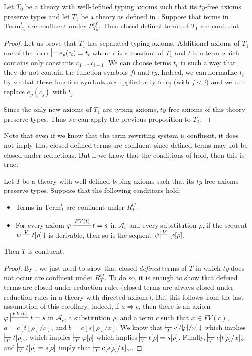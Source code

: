 \documentclass[reqno]{amsart}
\theoremstyle{definition}
\theoremstyle{remark}
\newcommand{\Term}{\mathrm{Term}}
\newcommand{\ft}{\mathit{ft}}
\newcommand{\ty}{\mathit{ty}}
\numberwithin{figure}{section}
\begin{document}
\begin{cor}
Let $T_0$ be a theory with well-defined typing axioms such that its $\ty$-free axioms preserve types and let $T_1$ be a theory as defined in .
Suppose that terms in $\Term_{T_0}^t$ are confluent under $R^{tf}_{T_0}$.
Then closed defined terms of $T_1$ are confluent.
\end{cor}
\begin{proof}
Let us prove that $T_1$ has separated typing axioms.
Additional axioms of $T_1$ are of the form $\sststile{}{} e_p(c_i) = t_i$ where $c$ is a constant of $T_1$ and $t$ is a term which contains only constants $c_1$, \ldots $c_{i-1}$.
We can choose terms $t_i$ in such a way that they do not contain the function symbols $\ft$ and $\ty$.
Indeed, we can normalize $t_i$ by  so that these function symbols are applied only to $c_j$ (with $j < i$) and we can replace $e_p(c_j)$ with $t_j$.

Since the only new axioms of $T_1$ are typing axioms, $\ty$-free axioms of this theory preserve types.
Thus we can apply the previous proposition to $T_1$.
\end{proof}

Note that even if we know that the term rewriting system is confluent, it does not imply that closed defined terms are confluent since defined terms may not be closed under reductions.
But if we know that the conditions of  hold, then this is true:
\begin{cor}[conf-th]
Let $T$ be a theory with well-defined typing axioms such that its $\ty$-free axioms preserve types.
Suppose that the following conditions hold:
\begin{itemize}
\item Terms in $\Term_T^t$ are confluent under $R^{tf}_T$.
\item For every axiom $\varphi \sststile{}{FV(t)} t = s$ in $\mathcal{A}_e$ and every substitution $\rho$, if the sequent $\psi \sststile{}{V} t[\rho]\!\downarrow$ is derivable, then so is the sequent $\psi \sststile{}{V} \varphi[\rho]$.
\end{itemize}
Then $T$ is confluent.
\end{cor}
\begin{proof}
By , we just need to show that closed \emph{defined} terms of $T$ in which $\ty$ does not occur are confluent under $R^{tf}_T$.
To do so, it is enough to show that defined terms are closed under reduction rules (closed terms are always closed under reduction rules in a theory with directed axioms).
But this follows from the last assumption of this corollary.
Indeed, if $a \Rightarrow b$, then there is an axiom $\varphi \sststile{}{FV(t)} t = s$ in $\mathcal{A}_e$, a substitution $\rho$, and a term $c$ such that $x \in FV(c)$, $a = c[t[\rho]/x]$, and $b = c[s[\rho]/x]$.
We know that $\sststile{T}{} c[t[\rho]/x]\!\downarrow$ which implies $\sststile{T}{} t[\rho]\!\downarrow$ which implies $\sststile{T}{} \varphi[\rho]$ which implies $\sststile{T}{} t[\rho] = s[\rho]$.
Finally, $\sststile{T}{} c[t[\rho]/x]\!\downarrow$ and $\sststile{T}{} t[\rho] = s[\rho]$ imply that $\sststile{T}{} c[s[\rho]/x]\!\downarrow$.
\end{proof}
\end{document}
